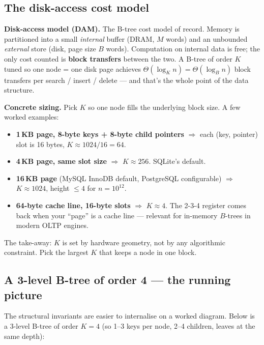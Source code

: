 \documentclass[11pt]{article}
\begin{document}
\subsection*{The disk-access cost model}

\begin{defnbox}
\textbf{Disk-access model (DAM).} The B-tree cost model of record.
Memory is partitioned into a small \emph{internal} buffer (DRAM,
$M$ words) and an unbounded \emph{external} store (disk, page size
$B$ words). Computation on internal data is free; the only cost
counted is \textbf{block transfers} between the two. A B-tree of
order $K$ tuned so one node = one disk page achieves
$\Theta(\log_K n) = \Theta(\log_B n)$ block transfers per
search / insert / delete --- and that's the whole point of the
data structure.
\end{defnbox}

\begin{notebox}
\textbf{Concrete sizing.} Pick $K$ so one node fills the underlying
block size. A few worked examples:
\begin{itemize}[leftmargin=*]
    \item \textbf{1\,KB page, 8-byte keys + 8-byte child pointers}
          $\Rightarrow$ each (key, pointer) slot is 16 bytes,
          $K \approx 1024 / 16 = 64$.
    \item \textbf{4\,KB page, same slot size} $\Rightarrow$
          $K \approx 256$. SQLite's default.
    \item \textbf{16\,KB page} (MySQL InnoDB default, PostgreSQL
          configurable) $\Rightarrow$ $K \approx 1024$, height
          $\le 4$ for $n = 10^{12}$.
    \item \textbf{64-byte cache line, 16-byte slots} $\Rightarrow$
          $K \approx 4$. The 2-3-4 register comes back when your
          ``page'' is a cache line --- relevant for in-memory
          $B$-trees in modern OLTP engines.
\end{itemize}
The take-away: $K$ is set by hardware geometry, not by any
algorithmic constraint. Pick the largest $K$ that keeps a node in
one block.
\end{notebox}

\subsection*{A 3-level B-tree of order 4 --- the running picture}

The structural invariants are easier to internalise on a worked
diagram. Below is a 3-level B-tree of order $K = 4$ (so 1--3 keys
per node, 2--4 children, leaves at the same depth):
\end{document}
